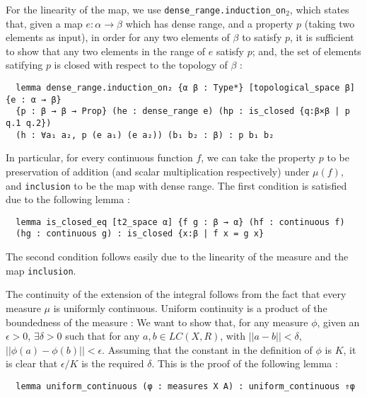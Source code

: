 \documentclass[a4paper,UKenglish,cleveref, autoref, thm-restate]{lipics-v2021}
\newcommand{\lean}[1]{\texttt{#1}\xspace} %
\begin{document}
For the linearity of the map, we use \lean{dense\_range.induction\_on$_2$}, which states that, given a map $e : \alpha \to \beta$ which has dense range, 
and a property $p$ (taking two elements as input), in order for any two elements of $\beta$ to satisfy $p$, it is sufficient to show that any two elements 
in the range of $e$ satisfy $p$; and, the set of elements satifying $p$ is closed with respect to the topology of $\beta$ :
\begin{lstlisting}
  lemma dense_range.induction_on₂ {α β : Type*} [topological_space β] {e : α → β} 
  {p : β → β → Prop} (he : dense_range e) (hp : is_closed {q:β×β | p q.1 q.2}) 
  (h : ∀a₁ a₂, p (e a₁) (e a₂)) (b₁ b₂ : β) : p b₁ b₂
\end{lstlisting}

In particular, for every continuous function $f$, we can take the property $p$ to be preservation of addition (and scalar multiplication respectively) under 
$\mu (f)$, and \lean{inclusion} to be the map with dense range. The first condition is satisfied due to the following lemma :
\begin{lstlisting}
  lemma is_closed_eq [t2_space α] {f g : β → α} (hf : continuous f) 
  (hg : continuous g) : is_closed {x:β | f x = g x}
\end{lstlisting}

The second condition follows easily due to the linearity of the measure and the map \lean{inclusion}. 

The continuity of the extension of the integral follows from the fact that every measure $\mu$ is uniformly continuous. Uniform continuity is a 
product of the boundedness of the measure : We want to show that, for any measure $\phi$, given an $\epsilon > 0$, $\exists \delta > 0$ such that 
for any $a, b \in LC(X, R)$, with $||a - b|| < \delta$, $|| \phi (a) - \phi (b) || < \epsilon$. Assuming that the constant in the definition of $\phi$ 
is $K$, it is clear that $\epsilon / K$ is the required $\delta$. This is the proof of the following lemma :
\begin{lstlisting}
  lemma uniform_continuous (φ : measures X A) : uniform_continuous ⇑φ 
\end{lstlisting}
\end{document}
